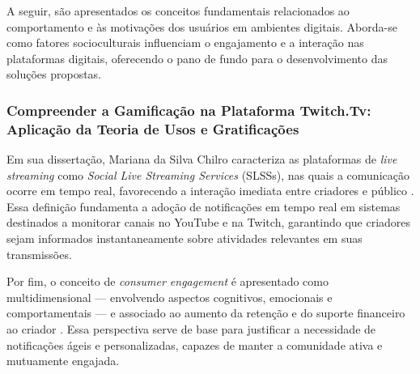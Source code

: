 A seguir, são apresentados os conceitos fundamentais relacionados ao comportamento e às motivações dos usuários em ambientes digitais. Aborda-se como fatores socioculturais influenciam o engajamento e a interação nas plataformas digitais, oferecendo o pano de fundo para o desenvolvimento das soluções propostas.

\subsubsection{Compreender a Gamificação na Plataforma Twitch.Tv: Aplicação da Teoria de Usos e Gratificações}

Em sua dissertação, Mariana da Silva Chilro caracteriza as plataformas de \textit{live streaming} como \textit{Social Live Streaming Services} (SLSSs), nas quais a comunicação ocorre em tempo real, favorecendo a interação imediata entre criadores e público \cite{daSilvaChilro2023}. Essa definição fundamenta a adoção de notificações em tempo real em sistemas destinados a monitorar canais no YouTube e na Twitch, garantindo que criadores sejam informados instantaneamente sobre atividades relevantes em suas transmissões.



Por fim, o conceito de \textit{consumer engagement} é apresentado como multidimensional — envolvendo aspectos cognitivos, emocionais e comportamentais — e associado ao aumento da retenção e do suporte financeiro ao criador \cite{daSilvaChilro2023}. Essa perspectiva serve de base para justificar a necessidade de notificações ágeis e personalizadas, capazes de manter a comunidade ativa e mutuamente engajada.

